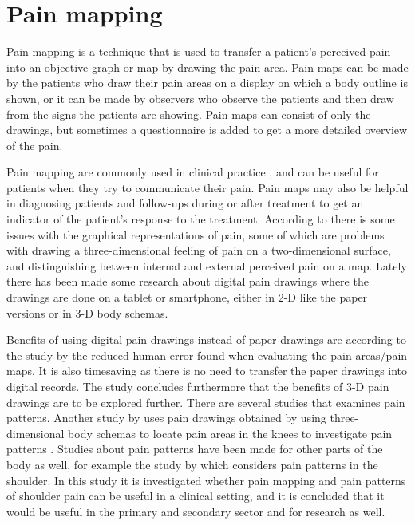 \section{Pain mapping}
Pain mapping is a technique that is used to transfer a patient’s perceived pain into an objective graph or map by drawing the pain area. Pain maps can be made by the patients who draw their pain areas on a display on which a body outline is shown, or it can be made by observers who observe the patients and then draw from the signs the patients are showing. Pain maps can consist of only the drawings, but sometimes a questionnaire is added to get a more detailed overview of the pain.\citep{Schott2010}


Pain mapping are commonly used in clinical practice \citep{Schott2010}, and can be useful for patients when they try to communicate their pain. Pain maps may also be helpful in diagnosing patients and follow-ups during or after treatment to get an indicator of the patient’s response to the treatment.\citep{Boudreau2016}
According to \citeauthor{Schott2010} there is some issues with the graphical representations of pain, some of which are problems with drawing a three-dimensional feeling of pain on a two-dimensional surface, and distinguishing between internal and external perceived pain on a map.\citep{Schott2010}
Lately there has been made some research about digital pain drawings where the drawings are done on a tablet or smartphone, either in 2-D like the paper versions or in 3-D body schemas.\citep{Boudreau2016}

Benefits of using digital pain drawings instead of paper drawings are according to the study by \citeauthor{Boudreau2016} the reduced human error found when evaluating the pain areas/pain maps. It is also timesaving as there is no need to transfer the paper drawings into digital records. The study concludes furthermore that the benefits of 3-D pain drawings are to be explored further.\citep{Boudreau2016}
There are several studies that examines pain patterns. Another study by \citeauthor{Boudreau2017} uses pain drawings obtained by using three-dimensional body schemas to locate pain areas in the knees to investigate pain patterns \citep{Boudreau2017}. Studies about pain patterns have been made for other parts of the body as well, for example the study by \citeauthor{Bayam2017} which considers pain patterns in the shoulder. In this study it is investigated whether pain mapping and pain patterns of shoulder pain can be useful in a clinical setting, and it is concluded that it would be useful in the primary and secondary sector and for research as well.\citep{Bayam2017}
